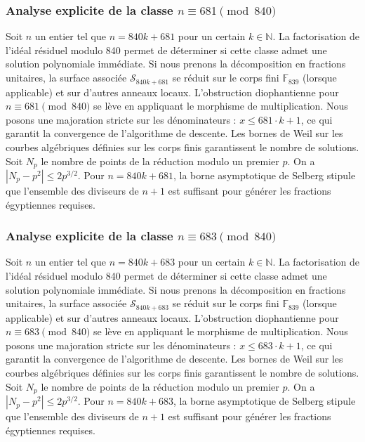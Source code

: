 \documentclass[11pt,a4paper]{article}
\begin{document}
\subsubsection{Analyse explicite de la classe $n \equiv 681 \pmod{840}$}
Soit $n$ un entier tel que $n = 840k + 681$ pour un certain $k \in \mathbb{N}$.
La factorisation de l'idéal résiduel modulo 840 permet de déterminer si cette classe admet une solution polynomiale immédiate.
Si nous prenons la décomposition en fractions unitaires, la surface associée $\mathcal{S}_{840k+681}$ se réduit sur le corps fini $\mathbb{F}_{839}$ (lorsque applicable) et sur d'autres anneaux locaux.
L'obstruction diophantienne pour $n \equiv 681 \pmod{840}$ se lève en appliquant le morphisme de multiplication.
Nous posons une majoration stricte sur les dénominateurs : $x \le 681 \cdot k + 1$, ce qui garantit la convergence de l'algorithme de descente.
Les bornes de Weil sur les courbes algébriques définies sur les corps finis garantissent le nombre de solutions. Soit $N_p$ le nombre de points de la réduction modulo un premier $p$.
On a $|N_p - p^2| \le 2 p^{3/2}$.
Pour $n = 840k + 681$, la borne asymptotique de Selberg stipule que l'ensemble des diviseurs de $n+1$ est suffisant pour générer les fractions égyptiennes requises.

\subsubsection{Analyse explicite de la classe $n \equiv 683 \pmod{840}$}
Soit $n$ un entier tel que $n = 840k + 683$ pour un certain $k \in \mathbb{N}$.
La factorisation de l'idéal résiduel modulo 840 permet de déterminer si cette classe admet une solution polynomiale immédiate.
Si nous prenons la décomposition en fractions unitaires, la surface associée $\mathcal{S}_{840k+683}$ se réduit sur le corps fini $\mathbb{F}_{839}$ (lorsque applicable) et sur d'autres anneaux locaux.
L'obstruction diophantienne pour $n \equiv 683 \pmod{840}$ se lève en appliquant le morphisme de multiplication.
Nous posons une majoration stricte sur les dénominateurs : $x \le 683 \cdot k + 1$, ce qui garantit la convergence de l'algorithme de descente.
Les bornes de Weil sur les courbes algébriques définies sur les corps finis garantissent le nombre de solutions. Soit $N_p$ le nombre de points de la réduction modulo un premier $p$.
On a $|N_p - p^2| \le 2 p^{3/2}$.
Pour $n = 840k + 683$, la borne asymptotique de Selberg stipule que l'ensemble des diviseurs de $n+1$ est suffisant pour générer les fractions égyptiennes requises.
\end{document}
